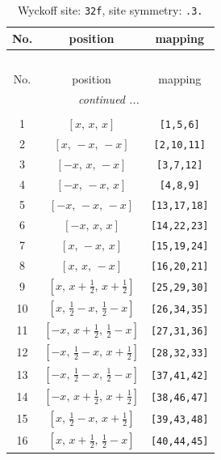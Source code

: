 \documentclass[fleqn,8pt]{jsarticle}
\begin{document}
\begin{longtable}{ccc}
\caption{Wyckoff site: {\tt 32f}, site symmetry: {\tt .3.}}
 \\
 \hline \hline
No. & position & mapping \\ \hline \endfirsthead

\multicolumn{2}{l}{\tablename\ \thetable{}} \\
 \hline \hline
No. & position & mapping \\ \hline \endhead

 \hline \hline
\multicolumn{2}{r}{\footnotesize\it continued ...} \\ \endfoot

 \hline \hline
\multicolumn{2}{r}{} \\ \endlastfoot

1 & $\left[ x,\, x,\, x \right]$ & {\tt [1,5,6]} \\ \hline
2 & $\left[ x,\, - x,\, - x \right]$ & {\tt [2,10,11]} \\ \hline
3 & $\left[ - x,\, x,\, - x \right]$ & {\tt [3,7,12]} \\ \hline
4 & $\left[ - x,\, - x,\, x \right]$ & {\tt [4,8,9]} \\ \hline
5 & $\left[ - x,\, - x,\, - x \right]$ & {\tt [13,17,18]} \\ \hline
6 & $\left[ - x,\, x,\, x \right]$ & {\tt [14,22,23]} \\ \hline
7 & $\left[ x,\, - x,\, x \right]$ & {\tt [15,19,24]} \\ \hline
8 & $\left[ x,\, x,\, - x \right]$ & {\tt [16,20,21]} \\ \hline
9 & $\left[ x,\, x + \frac{1}{2},\, x + \frac{1}{2} \right]$ & {\tt [25,29,30]} \\ \hline
10 & $\left[ x,\, \frac{1}{2} - x,\, \frac{1}{2} - x \right]$ & {\tt [26,34,35]} \\ \hline
11 & $\left[ - x,\, x + \frac{1}{2},\, \frac{1}{2} - x \right]$ & {\tt [27,31,36]} \\ \hline
12 & $\left[ - x,\, \frac{1}{2} - x,\, x + \frac{1}{2} \right]$ & {\tt [28,32,33]} \\ \hline
13 & $\left[ - x,\, \frac{1}{2} - x,\, \frac{1}{2} - x \right]$ & {\tt [37,41,42]} \\ \hline
14 & $\left[ - x,\, x + \frac{1}{2},\, x + \frac{1}{2} \right]$ & {\tt [38,46,47]} \\ \hline
15 & $\left[ x,\, \frac{1}{2} - x,\, x + \frac{1}{2} \right]$ & {\tt [39,43,48]} \\ \hline
16 & $\left[ x,\, x + \frac{1}{2},\, \frac{1}{2} - x \right]$ & {\tt [40,44,45]} \\ \hline

\end{longtable}
\end{document}
